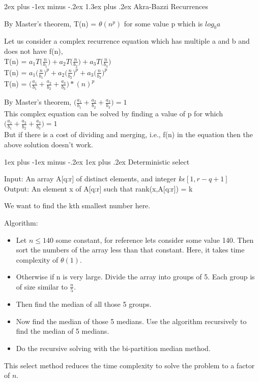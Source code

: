 \documentclass[11pt]{article}
\makeatletter
\renewcommand{\section}{\@startsection{section}{1}{0mm}%
                                   {2ex plus -1ex minus -.2ex}%
                                   {1.3ex plus .2ex}%
                                   {\normalfont\Large\bfseries}}%
\renewcommand{\subsection}{\@startsection{subsection}{2}{0mm}%
                                     {1ex plus -1ex minus -.2ex}%
                                     {1ex plus .2ex}%
                                     {\normalfont\large\bfseries}}%
\makeatother
\begin{document}
\section{Akra-Bazzi Recurrences} 
 
By Master's theorem,
T(n) = $\theta {(n^{p})}$ for some value p which is $ log_{b}{a} $

Let us consider a complex recurrence equation which has multiple a and b and does not have f(n),\\
T(n) = $a_1 T \biggl(\frac{n}{b_1}\biggr) + a_2 T \biggl(\frac{n}{b_2}\biggr) + a_3 T \biggl(\frac{n}{b_3}\biggr) $ \\ 

T(n) = $a_1 \biggl(\frac{n}{b_1}\biggr)^{p} + a_2  \biggl(\frac{n}{b_2}\biggr)^{p} + a_3  \biggl(\frac{n}{b_3}\biggr)^{p} $ \\

T(n) = $\biggl(\frac{a_1}{b_1} + \frac{a_2}{b_2} + \frac{a_3}{b_3} \biggr) * (n)^{p} $

By Master's theorem, $\biggl(\frac{a_1}{b_1} + \frac{a_2}{b_2} + \frac{a_3}{b_3} \biggr) =1 $ \\

This complex equation can be solved by finding a value of p for which $\biggl(\frac{a_1}{b_1} + \frac{a_2}{b_2} + \frac{a_3}{b_3} \biggr) =1 $ \\

But if there is a cost of dividing and merging, i.e., f(n) in the equation then the above solution doesn't work. 



\subsection{Deterministic select}

{Input:}  An array A[q:r] of distinct elements, and integer $k \epsilon [1,r-q + 1]$  \\
{Output:} An element x of A[q:r] such that rank(x,A[q:r]) = k 

We want to find the kth smallest number here.

Algorithm:

\begin{itemize}
\item Let $n \leq 140 $ some constant, for reference lets consider some value 140. Then sort the numbers of the array less than that  constant. Here, it takes time complexity of $\theta (1) $.
\item Otherwise if n is very large. Divide the array into groups of 5. Each group is of size similar to $\frac{n}{5}$.
\item Then find the median of all those 5 groups.
\item Now find the median of those 5 medians. Use the algorithm recursively to find the median of 5 medians.
\item Do the recursive solving with the bi-partition median method.
\end{itemize}
This select method reduces the time complexity to solve the problem to a factor of $n$. 
\end{document}
